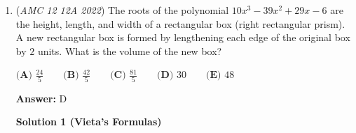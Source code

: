 \begin{enumerate}
Using log properties, we combine the terms to make our expression equal to $\log {( (5^{\log^2{5}}) \cdot (20^{\log^2{20}}) \cdot 8 ^ {\log{\frac{1}{4}}} ) }$. By exponent properties, we separate the part with base $20$ to become $20^{\log^2{5}} \cdot 20^{\log^2{20}-\log^2{5}}$. Then, we substitute this into the original expression to get $\log {( (5^{\log^2{5}}) \cdot 20^{\log^2{5}} \cdot 20^{\log^2{20}-\log^2{5}} \cdot 8 ^ {\log{\frac{1}{4}}} ) } = \log {( (100^{\log^2{5}}) \cdot 20^{\log^2{20}-\log^2{5}} \cdot 8 ^ {\log{\frac{1}{4}}} ) }$. Because $100^{\log^2{5}} = 25^{\log{5}}$, and $\log^2{20}-\log^2{5} = (\log{20}+\log{5})(\log{20}-\log{5}) = \log{100}\cdot\log{4} = 2\log{4}$, this expression is equal to $\log {( 25 ^ {\log{5}} \cdot 400^{\log{4}} \cdot 8 ^ {\log{\frac{1}{4}}} ) }$. We perform the step with the base combining on $25$ and $400$ to get $25 ^ {\log{5}} \cdot 400^{\log{4}}  = 25 ^ {\log{5}-\log{4}} \cdot 10000^{\log{4}} = 25^{\log{\frac{5}{4}}}\cdot 256$. Putting this back into the whole equation gives $\log{( 25^{\log{\frac{5}{4}}}\cdot 256 \cdot 8^{\log{\frac{1}{4}}})}$. One last base merge remains - but $25\cdot 8$ isn't a power of 10. We can rectify this by converting $8^{\log{\frac{1}{4}}}$ to $(4^\frac{3}{2})^{\log{\frac{1}{4}}} = 4^{\log{ \frac{1}{8} }}$. Finally, we complete this arduous process by performing the base merge on $\log{( 25^{\log{\frac{5}{4}}}\cdot 256 \cdot 4^{\log{\frac{1}{8}}})}$. We get $25^{\log{\frac{5}{4}}} \cdot 4^{\log{\frac{1}{8}}} = 25^{\log{\frac{5}{4}}-\log{\frac{1}{8}}} \cdot 100^{\log{\frac{1}{8}}} = 25^{\log{10}} \cdot \frac{1}{64} = \frac{25}{64}$. Putting this back into that original equation one last time, we get $\log(256 \cdot \frac{25}{64}) = \log{100} = \boxed{2}$.~aop2014

 


	\item (\textit{AMC 12 12A 2022}) The roots of the polynomial $10x^3-39x^2+29x-6$ are the height, length, and width of a rectangular box (right rectangular prism). A new rectangular box is formed by lengthening each edge of the original box by $2$ units. What is the volume of the new box?


 $\textbf{(A) } \frac{24}{5} \qquad \textbf{(B) } \frac{42}{5} \qquad \textbf{(C) } \frac{81}{5} \qquad \textbf{(D) } 30 \qquad \textbf{(E) } 48$

 \textbf{Answer: }D



\textbf{Solution 1 (Vieta's Formulas)}


\end{enumerate}
